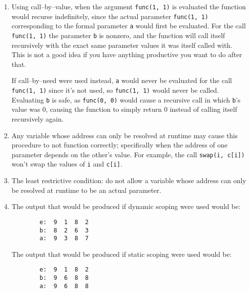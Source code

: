 \documentclass[11pt]{article}
\begin{document}
\begin{enumerate}
    \item Using call--by--value, when the argument \texttt{func(1, 1)} is
          evaluated the function would recurse indefinitely, since the
          actual parameter \texttt{func(1, 1)} corresponding to the formal
          parameter \texttt{a} would first be evaluated.  For the call
          \texttt{func(1, 1)} the parameter \texttt{b} is nonzero, and the
          function will call itself recursively with the exact same
          parameter values it was itself called with.  This is not a good
          idea if you have anything productive you want to do after that.

          If call--by--need were used instead, \texttt{a} would never be
          evaluated for the call \texttt{func(1, 1)} since it's not used, so
          \texttt{func(1, 1)} would never be called.  Evaluating \texttt{b}
          is safe, as \texttt{func(0, 0)} would cause a recursive call in
          which \texttt{b}'s value was 0, causing the function to simply
          return 0 instead of calling itself recursively again.

    \item Any variable whose address can only be resolved at runtime may
          cause this procedure to not function correctly; specifically when
          the address of one parameter depends on the other's value.  For
          example, the call \texttt{swap(i, c[i])} won't swap the values of
          \texttt{i} and \texttt{c[i]}.

    \item The least restrictive condition: do not allow a variable whose
          address can only be resolved at runtime to be an actual parameter.

    \item The output that would be produced if dynamic scoping were used
          would be:

          \begin{Verbatim}
        e:  9  1  8  2
        b:  8  2  6  3
        a:  9  3  8  7
          \end{Verbatim}

          The output that would be produced if static scoping were used
          would be:

          \begin{Verbatim}
        e:  9  1  8  2
        b:  9  6  8  8
        a:  9  6  8  8
          \end{Verbatim}

  \end{enumerate}
\end{document}
